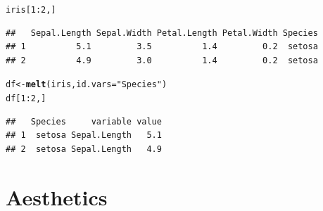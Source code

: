 \documentclass{beamer}\usepackage[]{graphicx}\usepackage[]{color}
\makeatletter
\newcommand{\hlstr}[1]{\textcolor[rgb]{0.192,0.494,0.8}{#1}}%
\newcommand{\hlkwd}[1]{\textcolor[rgb]{0.737,0.353,0.396}{\textbf{#1}}}%
\newenvironment{kframe}{%
 \def\at@end@of@kframe{}%
 \ifinner\ifhmode%
  \def\at@end@of@kframe{\end{minipage}}%
  \begin{minipage}{\columnwidth}%
 \fi\fi%
 \def\FrameCommand##1{\hskip\@totalleftmargin \hskip-\fboxsep
 \colorbox{shadecolor}{##1}\hskip-\fboxsep
     \hskip-\linewidth \hskip-\@totalleftmargin \hskip\columnwidth}%
 \MakeFramed {\advance\hsize-\width
   \@totalleftmargin\z@ \linewidth\hsize
   \@setminipage}}%
 {\par\unskip\endMakeFramed%
 \at@end@of@kframe}
\newenvironment{knitrout}{}{} %
\makeatother
\begin{document}
\begin{frame}[fragile]
\begin{knitrout}\footnotesize
{}\color{fgcolor}\begin{kframe}
\begin{alltt}
iris[1:2, ]
\end{alltt}
\begin{verbatim}
##   Sepal.Length Sepal.Width Petal.Length Petal.Width Species
## 1          5.1         3.5          1.4         0.2  setosa
## 2          4.9         3.0          1.4         0.2  setosa
\end{verbatim}
\begin{alltt}
df  <- \hlkwd{melt}(iris, id.vars = \hlstr{"Species"})
df[1:2, ]
\end{alltt}
\begin{verbatim}
##   Species     variable value
## 1  setosa Sepal.Length   5.1
## 2  setosa Sepal.Length   4.9
\end{verbatim}
\end{kframe}
\end{knitrout}

\end{frame}


\section*{Aesthetics}
\frame{\sectionpage}

\end{document}
